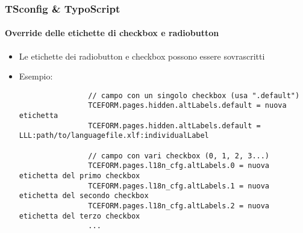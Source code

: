 
\begin{frame}[fragile]
	\frametitle{TSconfig \& TypoScript}
	\framesubtitle{Override delle etichette di checkbox e radiobutton}

	\lstset{basicstyle=\tiny\ttfamily}

	\begin{itemize}

		\item Le etichette dei radiobutton e checkbox possono essere sovrascritti
		\item Esempio:

			\begin{lstlisting}
				// campo con un singolo checkbox (usa ".default")
				TCEFORM.pages.hidden.altLabels.default = nuova etichetta
				TCEFORM.pages.hidden.altLabels.default = LLL:path/to/languagefile.xlf:individualLabel

				// campo con vari checkbox (0, 1, 2, 3...)
				TCEFORM.pages.l18n_cfg.altLabels.0 = nuova etichetta del primo checkbox
				TCEFORM.pages.l18n_cfg.altLabels.1 = nuova etichetta del secondo checkbox
				TCEFORM.pages.l18n_cfg.altLabels.2 = nuova etichetta del terzo checkbox
				...
			\end{lstlisting}

	\end{itemize}

\end{frame}


